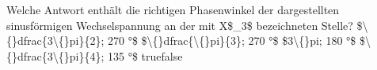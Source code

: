     {Welche Antwort enthält die richtigen Phasenwinkel der dargestellten sinusförmigen Wechselspannung an der mit X\$\_3\$ bezeichneten Stelle?}
    {\$\textbackslash\{\}dfrac\{3\textbackslash\{\}pi\}\{2\}; 270 °\$}
    {\$\textbackslash\{\}dfrac\{\textbackslash\{\}pi\}\{3\}; 270 °\$}
    {\$3\textbackslash\{\}pi; 180 °\$}
    {\$\textbackslash\{\}dfrac\{3\textbackslash\{\}pi\}\{4\}; 135 °\$}
    {true}{false}